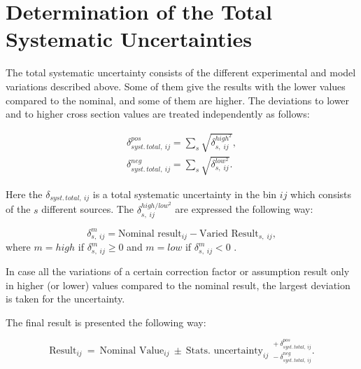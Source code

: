 \section{Determination of the Total Systematic Uncertainties}

The total systematic uncertainty consists of the different experimental and model variations described above.
Some of them give the results with the lower values compared to the nominal, and some of them are higher.
The deviations to lower and to higher cross section values are treated independently as follows:

\begin{align}
 \delta_{syst.\,total,\:ij}^{pos} = \sum_{s}\sqrt{\delta_{s,\;ij}^{high^{2}}}, \\
 \delta_{syst.\,total,\:ij}^{neg} = \sum_{s} \sqrt{\delta_{s,\;ij}^{low^{2}}}.
\end{align}

Here the $\delta_{syst.\,total,\:ij}$ is a total systematic uncertainty in the bin $ij$ which consists of the
$s$ different sources. The $\delta_{s,\;ij}^{high/low^{2}}$ are expressed the following way:

\begin{equation}
 \delta_{s,\;ij}^{m} = \textrm{Nominal result}_{ij} - \textrm{Varied Result}_{s,\;ij}, 
\end{equation}
where $m = high$ if $\delta_{s,\;ij}^{m} \geq 0$ and $m = low$ if $\delta_{s,\;ij}^{m} < 0$ . 

In case all the variations of a certain correction factor or assumption result only in higher (or lower) values 
compared to the nominal result, the largest deviation is taken for the uncertainty.

The final result is presented the following way:

\begin{equation}
 \textrm{Result}_{ij}\: = \: \textrm{Nominal Value}_{ij}\: \pm \: \textrm{Stats. uncertainty}_{ij}\:\: { }^{+\:\delta_{syst.\,total,\:ij}^{pos}}_{-\:\delta_{syst.\,total,\:ij}^{neg}}.
\end{equation}

